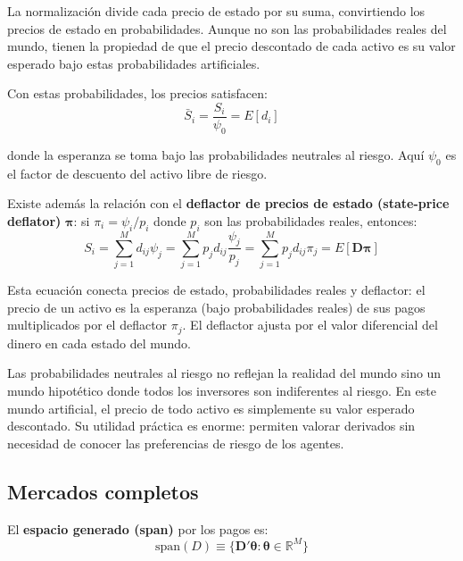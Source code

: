 \documentclass[12pt]{article}
\begin{document}
\begin{intuicionmat}
La normalizaci\'on divide cada precio de estado por su suma, convirtiendo los precios de estado en probabilidades. Aunque no son las probabilidades reales del mundo, tienen la propiedad de que el precio descontado de cada activo es su valor esperado bajo estas probabilidades artificiales.
\end{intuicionmat}

Con estas probabilidades, los precios satisfacen:
\begin{equation}
    \bar{S}_i = \frac{S_i}{\psi_0} = E[d_i]
\end{equation}

donde la esperanza se toma bajo las probabilidades neutrales al riesgo. Aqu\'i $\psi_0$ es el factor de descuento del activo libre de riesgo.

Existe adem\'as la relaci\'on con el \textbf{deflactor de precios de estado (state-price deflator)} $\boldsymbol{\pi}$: si $\pi_i = \psi_i / p_i$ donde $p_i$ son las probabilidades reales, entonces:
\begin{equation}
    S_i = \sum_{j=1}^{M} d_{ij}\psi_j = \sum_{j=1}^{M} p_j d_{ij} \frac{\psi_j}{p_j} = \sum_{j=1}^{M} p_j d_{ij} \pi_j = E[\mathbf{D}\boldsymbol{\pi}]
\end{equation}

\begin{intuicionmat}
Esta ecuaci\'on conecta precios de estado, probabilidades reales y deflactor: el precio de un activo es la esperanza (bajo probabilidades reales) de sus pagos multiplicados por el deflactor $\pi_j$. El deflactor ajusta por el valor diferencial del dinero en cada estado del mundo.
\end{intuicionmat}

\begin{intuicion}
Las probabilidades neutrales al riesgo no reflejan la realidad del mundo sino un mundo hipot\'etico donde todos los inversores son indiferentes al riesgo. En este mundo artificial, el precio de todo activo es simplemente su valor esperado descontado. Su utilidad pr\'actica es enorme: permiten valorar derivados sin necesidad de conocer las preferencias de riesgo de los agentes.
\end{intuicion}

\subsection{Mercados completos}

El \textbf{espacio generado (span)} por los pagos es:
\begin{equation}
    \text{span}(D) \equiv \{\mathbf{D}'\boldsymbol{\theta} : \boldsymbol{\theta} \in \mathbb{R}^M\}
\end{equation}
\end{document}

